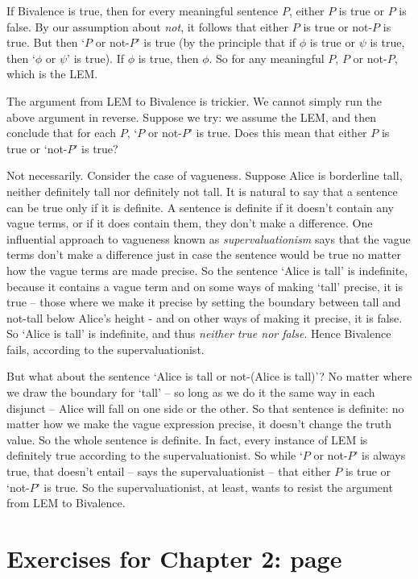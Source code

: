 \begin{enumerate}
If Bivalence is true, then for every meaningful sentence $P$, either $P$ is true or $P$ is false. By our assumption about \emph{not}, it follows that either $P$ is true or not-$P$ is true. But then `$P$ or not-$P$' is true (by the principle that if $\phi$ is true or $\psi$ is true, then `$\phi$ or $\psi$' is true). If $\phi$ is true, then $\phi$. So for any meaningful $P$, $P$ or not-$P$, which is the LEM.

The argument from LEM to Bivalence is trickier. We cannot simply run the above argument in reverse. Suppose we try: we assume the LEM, and then conclude that for each $P$, `$P$ or not-$P$' is true. Does this mean that either $P$ is true or `not-$P$' is true? 

Not necessarily. Consider the case of vagueness. Suppose Alice is borderline tall, neither definitely tall nor definitely not tall. It is natural to say that a sentence can be true only if it is definite. A sentence is definite if it doesn't contain any vague terms, or if it does contain them, they don't make a difference. One influential approach to vagueness known as \emph{supervaluationism} \citep{fine} says that the vague terms don't make a difference just in case the sentence would be true no matter how the vague terms are made precise. So the sentence `Alice is tall' is indefinite, because it contains a vague term and on some ways of making `tall' precise, it is true – those where we make it precise by setting the boundary between tall and not-tall below Alice's height - and on other ways of making it precise, it is false. So `Alice is tall' is indefinite, and thus \emph{neither true nor false}. Hence Bivalence fails, according to the supervaluationist.

But what about the sentence `Alice is tall or not-(Alice is tall)'? No matter where we draw the boundary for `tall' – so long as we do it the same way in each disjunct – Alice will fall on one side or the other. So that sentence is definite: no matter how we make the vague expression precise, it doesn't change the truth value. So the whole sentence is definite. In fact, every instance of LEM is definitely true according to the supervaluationist. So while `$P$ or not-$P$' is always true, that doesn't entail – says the supervaluationist – that either $P$ is true or `not-$P$' is true. So the supervaluationist, at least, wants to resist the argument from LEM to Bivalence.
\end{enumerate}

\section*{Exercises for Chapter 2: page \pageref{ex2}} \label{ans2}

